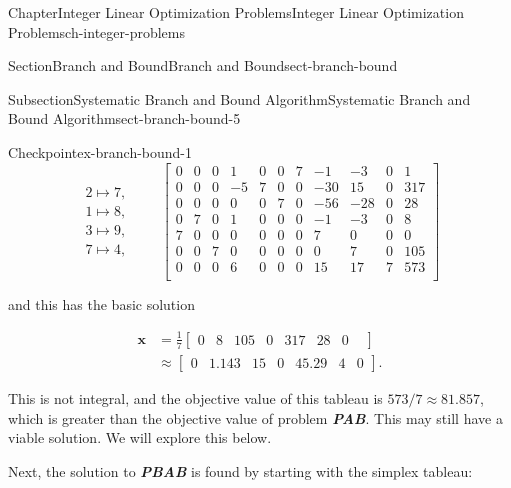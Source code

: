 \documentclass[oneside,10pt,]{book}
\newcommand{\alert}[1]{\textbf{\textit{#1}}}
\numberwithin{equation}{section}
\newcommand{\amp}{&}
\begin{document}
\begin{chapterptx}{Chapter}{Integer Linear Optimization Problems}{}{Integer Linear Optimization Problems}{}{}{ch-integer-problems}
\begin{sectionptx}{Section}{Branch and Bound}{}{Branch and Bound}{}{}{sect-branch-bound}
\begin{subsectionptx}{Subsection}{Systematic Branch and Bound Algorithm}{}{Systematic Branch and Bound Algorithm}{}{}{sect-branch-bound-5}
\begin{inlineexercise}{Checkpoint}{}{ex-branch-bound-1}
\begin{equation*}
\begin{array}{r} 2 \mapsto 7, \\ 1 \mapsto 8, \\ 3 \mapsto 9, \\ 7 \mapsto 4, \end{array} \qquad \left[\begin{array}{rrr|rrrrrrr|r} 0 \amp 0 \amp 0 \amp 1 \amp 0 \amp 0 \amp 7 \amp -1 \amp -3 \amp 0 \amp 1\\ 0 \amp 0 \amp 0 \amp -5 \amp 7 \amp 0 \amp 0 \amp -30 \amp 15 \amp 0 \amp 317\\ 0 \amp 0 \amp 0 \amp 0 \amp 0 \amp 7 \amp 0 \amp -56 \amp -28 \amp 0 \amp 28\\ 0 \amp 7 \amp 0 \amp 1 \amp 0 \amp 0 \amp 0 \amp -1 \amp -3 \amp 0 \amp 8\\ 7 \amp 0 \amp 0 \amp 0 \amp 0 \amp 0 \amp 0 \amp 7 \amp 0 \amp 0 \amp 0\\ 0 \amp 0 \amp 7 \amp 0 \amp 0 \amp 0 \amp 0 \amp 0 \amp 7 \amp 0 \amp 105\\ \hline 0 \amp 0 \amp 0 \amp 6 \amp 0 \amp 0 \amp 0 \amp 15 \amp 17 \amp 7 \amp 573\\ \end{array} \right]
\end{equation*}
%
\par
and this has the basic solution%
\par
%
\begin{equation*}
\begin{aligned} \boldsymbol{x} \amp = \frac{1}{7} \left[\begin{array}{rrr|rrrrrr} 0 \amp 8 \amp 105 \amp 0 \amp 317 \amp 28 \amp 0 \amp  \end{array}\right] \\ \amp \approx \left[\begin{array}{rrr|rrrr} 0 \amp 1.143 \amp 15 \amp 0 \amp 45.29 \amp 4 \amp 0 \end{array}\right].
\end{aligned}
\end{equation*}
%
\par
This is not integral, and the objective value of this tableau is \(573/7\approx 81.857\), which is greater than the objective value of problem \alert{PAB}. This may still have a viable solution. We will explore this below.%
\par
Next, the solution to \alert{PBAB} is found by starting with the simplex tableau:%
\par
%
\begin{equation*}

\end{equation*}
\end{inlineexercise}
\end{subsectionptx}
\end{sectionptx}
\end{chapterptx}
\end{document}
